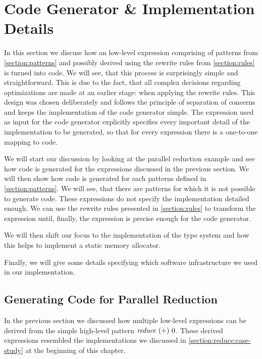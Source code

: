 \section{Code Generator \& Implementation Details}
In this section we discuss how an low-level expression comprising of patterns from \autoref{section:patterns} and possibly derived using the rewrite rules from \autoref{section:rules} is turned into \OpenCL code.
We will see, that this process is surprisingly simple and straightforward.
This is due to the fact, that all complex decisions regarding optimizations are made at an earlier stage: when applying the rewrite rules.
This design was chosen deliberately and follows the principle of separation of concerns and keeps the implementation of the code generator simple.
The expression used as input for the code generator explicitly specifies every important detail of the \OpenCL implementation to be generated, so that for every expression there is a one-to-one mapping to \OpenCL code.

We will start our discussion by looking at the parallel reduction example and see how \OpenCL code is generated for the expressions discussed in the previous section.
We will then show how \OpenCL code is generated for each patterns defined in \autoref{section:patterns}.
We will see, that there are patterns for which it is not possible to generate \OpenCL code.
These expressions do not specify the \OpenCL implementation detailed enough.
We can use the rewrite rules presented in \autoref{section:rules} to transform the expression until, finally, the expression is precise enough for the code generator.

We will then shift our focus to the implementation of the type system and how this helps to implement a static memory allocator.

Finally, we will give some details specifying which software infrastructure we used in our implementation.

\subsection{Generating \OpenCL Code for Parallel Reduction}
In the previous section we discussed how multiple low-level expressions can be derived from the simple high-level pattern $\text{\textit{reduce}}\ (+)\ 0$.
These derived expressions resembled the \OpenCL implementations we discussed in \autoref{section:reduce:case-study} at the beginning of this chapter.

